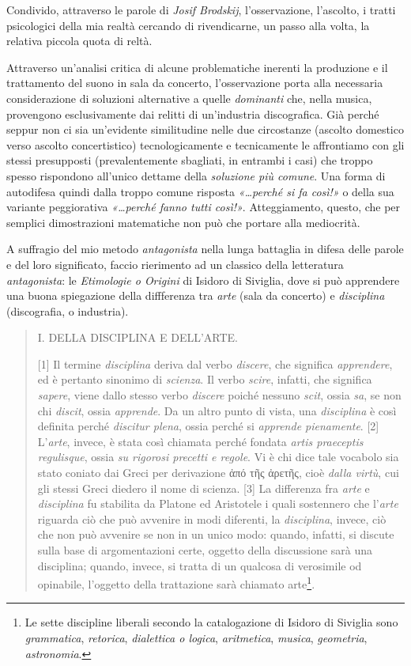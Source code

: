 \documentclass[a4paper,11pt]{article}
\begin{document}
Condivido, attraverso le parole di \emph{Josif Brodskij}, l'osservazione,
l'ascolto, i tratti psicologici della mia realtà cercando di
rivendicarne, un passo alla volta, la relativa piccola quota di reltà.

Attraverso un'analisi critica di alcune problematiche inerenti la
produzione e il trattamento del suono in sala da concerto,
l'osservazione porta alla necessaria considerazione di soluzioni
alternative a quelle \emph{dominanti} che, nella musica, provengono
esclusivamente dai relitti di un'industria discografica. Già perché
seppur non ci sia un'evidente similitudine nelle due circostanze
(ascolto domestico verso ascolto concertistico) tecnologicamente e
tecnicamente le affrontiamo con gli stessi presupposti (prevalentemente
sbagliati, in entrambi i casi) che troppo spesso rispondono all'unico
dettame della \emph{soluzione più comune}. Una forma di autodifesa quindi
dalla troppo comune risposta \emph{«\ldots{}perché si fa così!»} o della sua
variante peggiorativa \emph{«\ldots{}perché fanno tutti così!»}. Atteggiamento,
questo, che per semplici dimostrazioni matematiche non può che portare
alla mediocrità.

A suffragio del mio metodo \emph{antagonista} nella lunga battaglia in difesa
delle parole e del loro significato, faccio rierimento ad un classico
della letteratura \emph{antagonista}: le \emph{Etimologie o Origini} di Isidoro di
Siviglia, dove si può apprendere una buona spiegazione della diffferenza
tra \emph{arte} (sala da concerto) e \emph{disciplina} (discografia, o industria).

\begin{quotation}
I. DELLA DISCIPLINA E DELL'ARTE.

{[}1{]} Il termine \emph{disciplina} deriva dal verbo \emph{discere}, che
significa \emph{apprendere}, ed è pertanto sinonimo di \emph{scienza}. Il verbo
\emph{scire}, infatti, che significa \emph{sapere}, viene dallo stesso verbo
\emph{discere} poiché nessuno \emph{scit}, ossia \emph{sa}, se non chi \emph{discit},
ossia \emph{apprende}. Da un altro punto di vista, una \emph{disciplina} è così
definita perché \emph{discitur plena}, ossia perché si \emph{apprende
pienamente}. {[}2{]} L'\emph{arte}, invece, è stata così chiamata perché
fondata \emph{artis praeceptis regulisque}, ossia \emph{su rigorosi precetti e
regole}. Vi è chi dice tale vocabolo sia stato coniato dai Greci per
derivazione ἀπό τῆς ἀρετῆς, cioè \emph{dalla virtù}, cui gli stessi Greci
diedero il nome di scienza. {[}3{]} La differenza fra \emph{arte} e
\emph{disciplina} fu stabilita da Platone ed Aristotele i quali sostennero
che l'\emph{arte} riguarda ciò che può avvenire in modi diferenti, la
\emph{disciplina}, invece, ciò che non può avvenire se non in un unico
modo: quando, infatti, si discute sulla base di argomentazioni certe,
oggetto della discussione sarà una disciplina; quando, invece, si
tratta di un qualcosa di verosimile od opinabile, l'oggetto della
trattazione sarà chiamato arte\footnote{Le sette discipline liberali secondo la catalogazione di Isidoro
di Siviglia sono \emph{grammatica}, \emph{retorica}, \emph{dialettica o logica},
\emph{aritmetica}, \emph{musica}, \emph{geometria}, \emph{astronomia}.}.
\end{quotation}
\end{document}

